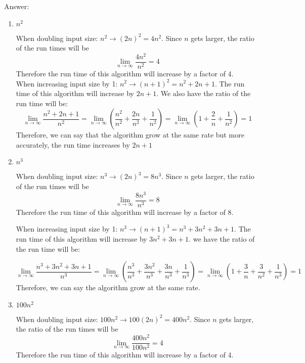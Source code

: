 \documentclass{cpsc413Solutions}
\begin{document}


\begin{problemlist}
\begin{problem}
\begin{answer}
Answer:
\newline
\begin{enumerate}
\item $n^2$ 

When doubling input size: $n^2 \xrightarrow{} (2n)^2 = 4n^2$. 
Since $n$ gets larger, the ratio of the run times will be $$\lim_{n\to\infty}\frac{4n^2}{n^2} = 4$$ Therefore the run time of this algorithm will increase by a factor of 4.\\

When increasing input size by 1: $n^2 \xrightarrow{} (n+1)^2 = n^2 + 2n + 1$.
The run time of this algorithm will increase by $2n+1$. We also have the ratio of the run time will be:
$$\lim_{n \to \infty} \frac{n^2 + 2n +1}{n^2} = \lim_{n \to \infty} (\frac{n^2}{n^2} + \frac{2n}{n^2} + \frac{1}{n^2}) = \lim_{n\to\infty}(1+\frac{2}{n} + \frac{1}{n^2}) = 1$$
Therefore, we can say that the algorithm grow at the same rate but more accurately, the run time increases by $2n+1$

\item $n^3$

When doubling input size: $n^3 \xrightarrow{} (2n)^3 = 8n^3$. 
Since $n$ gets larger, the ratio of the run times will be $$\lim_{n\to\infty}\frac{8n^3}{n^3} = 8$$ Therefore the run time of this algorithm will increase by a factor of 8.

When increasing input size by 1: $n^3 \xrightarrow{} (n+1)^3 = n^3 + 3n^2 +3n + 1$.
The run time of this algorithm will increase by $3n^2 +3n + 1$. we have the ratio of the run time will be:

$$\lim_{n \to \infty} \frac{n^3 + 3n^2 +3n + 1}{n^3} = \lim_{n \to \infty} (\frac{n^3}{n^3} + \frac{3n^2}{n^3} + \frac{3n}{n^3}+ \frac{1}{n^3}) = \lim_{n\to\infty}(1+\frac{3}{n} + \frac{3}{n^2} + \frac{1}{n^3} ) = 1$$
Therefore, we can say the algorithm grow at the same rate.

\item $100n^2$

When doubling input size: $100n^2 \xrightarrow{} 100(2n)^2 = 400n^2$. 
Since $n$ gets larger, the ratio of the run times will be $$\lim_{n\to\infty}\frac{400n^2}{100n^2} = 4$$ Therefore the run time of this algorithm will increase by a factor of 4.


\end{enumerate}
\end{answer}
\end{problem}
\end{problemlist}
\end{document}
